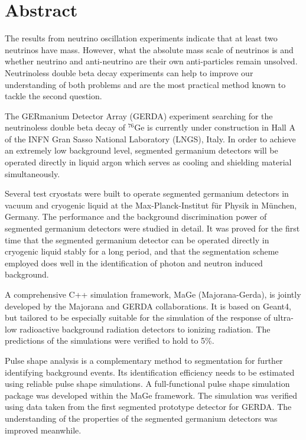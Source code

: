 \section*{Abstract}
The results from neutrino oscillation experiments indicate that at least two neutrinos have mass. However, what the absolute mass scale of neutrinos is and whether neutrino and anti-neutrino are their own anti-particles remain unsolved. Neutrinoless double beta decay experiments can help to improve our understanding of both problems and are the most practical method known to tackle the second question. 

The GERmanium Detector Array (GERDA) experiment searching for the neutrinoless double beta decay of $^{76}$Ge is currently under construction in Hall A of the INFN Gran Sasso National Laboratory (LNGS), Italy. In order to achieve an extremely low background level, segmented germanium detectors will be operated directly in liquid argon which serves as cooling and shielding material simultaneously. 

Several test cryostats were built to operate segmented germanium detectors in vacuum and cryogenic liquid at the Max-Planck-Institut f\"ur Physik in M\"unchen, Germany. The performance and the background discrimination power of segmented germanium detectors were studied in detail. It was proved for the first time that the segmented germanium detector can be operated directly in cryogenic liquid stably for a long period, and that the segmentation scheme employed does well in the identification of photon and neutron induced background.

A comprehensive C++ simulation framework, MaGe (Majorana-Gerda), is jointly developed by the Majorana and GERDA collaborations. It is based on Geant4, but tailored to be especially suitable for the simulation of the response of ultra-low radioactive background radiation detectors to ionizing radiation. The predictions of the simulations were verified to hold to 5\%.

Pulse shape analysis is a complementary method to segmentation for further identifying background events. Its identification efficiency needs to be estimated using reliable pulse shape simulations. A full-functional pulse shape simulation package was developed within the MaGe framework. The simulation was verified using data taken from the first segmented prototype detector for GERDA. The understanding of the properties of the segmented germanium detectors was improved meanwhile.

\clearpage


